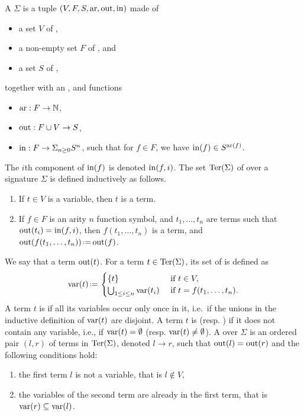 A  $\Sigma$ is a tuple $(V,F,S,\mathrm{ar},\mathrm{out},\mathrm{in})$ made of 
\begin{itemize}
  \item a set $V$ of ,
  \item a non-empty set $F$ of , and
  \item a set $S$ of ,
\end{itemize}
together with an ,  and  functions
\begin{itemize}
  \item $\mathrm{ar} : F \to \mathbb{N}$,
  \item $\mathrm{out} : F \cup V \to S$,
  \item $\mathrm{in} : F \to \Sigma_{n \geq 0} S^{n}$, such that for $f \in F$, we have $\mathrm{in}(f) \in S^{\mathrm{ar}(f)}$. 
\end{itemize}
The $i$th component of $\mathrm{in}(f)$ is denoted $\mathrm{in}(f,i)$.
The set $\mathrm{Ter}(\Sigma)$ of  over a signature $\Sigma$ is defined inductively as follows. 
\begin{enumerate}
  \item If $t \in V$ is a variable, then $t$ is a term.
  \item If $f \in F$ is an arity $n$ function symbol, and $t_1,\ldots,t_n$ are terms such that $\mathrm{out}(t_i)=\mathrm{in}(f,i)$, then $f(t_1,\ldots,t_n)$ is a term, and $\outsort(f(t_1,\ldots,t_n))\eqdef \outsort(f)$.
\end{enumerate}
We say that a term   $\mathrm{out}(t)$.
For a term $t \in \mathrm{Ter}(\Sigma)$, its set of  is defined as 
\begin{equation*}
  \var(t) \eqdef  
  \begin{cases}
    \{t\} & \text{ if } t \in V, \\
    \bigcup_{1 \leq i \leq n}\var(t_i) & \text{ if } t=f(t_1,\ldots,t_n).
  \end{cases}
\end{equation*}
A term $t$ is  if all its variables occur only once in it, i.e.\ if the unions in the inductive definition of $ \mathrm{var}(t)$ are disjoint.
A term $t$ is  (resp.  ) if it does not contain any variable, i.e., if $\mathrm{var}(t)=\emptyset$ (resp. $\mathrm{var}(t)\neq\emptyset$).
A  over $\Sigma$ is an ordered pair $(l,r)$ of terms in $\mathrm{Ter}(\Sigma)$, denoted $l \to r$, such that
$\mathrm{out}(l)=\mathrm{out}(r)$ and  the following conditions hold:
\begin{enumerate}
  \item the first term $l$ is not a variable, that is $l \notin V$,
  \item the variables of the second term are already in the first term, that is $\mathrm{var}(r) \subseteq \mathrm{var}(l)$.
\end{enumerate}

